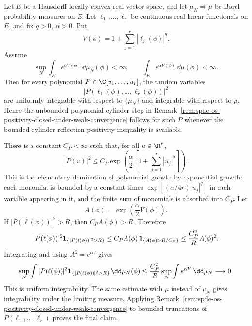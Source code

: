 \begin{remark}
\label{rem:spde-polynomial-os-uniform-integrability}
Let \(E\) be a Hausdorff locally convex real vector space, and let
\(\mu_N\Rightarrow\mu\) be Borel probability measures on \(E\).  Let
\(\ell_1,\ldots,\ell_r\) be continuous real linear functionals on \(E\), and
fix \(q>0\), \(\alpha>0\).  Put
\[
  V(\phi)=1+\sum_{j=1}^r|\ell_j(\phi)|^q .
\]
Assume
\begin{equation}
  \sup_N\int_E e^{\alpha V(\phi)}\,\dd\mu_N(\phi)<\infty,
  \qquad
  \int_E e^{\alpha V(\phi)}\,\dd\mu(\phi)<\infty .
  \label{eq:spde-exponential-cylinder-moment-bound}
\end{equation}
Then for every polynomial \(P\in\C[u_1,\ldots,u_r]\), the random variables
\[
  |P(\ell_1(\phi),\ldots,\ell_r(\phi))|^2
\]
are uniformly integrable with respect to \(\{\mu_N\}\) and integrable with
respect to \(\mu\).  Hence the unbounded polynomial-cylinder step in
Remark~\ref{rem:spde-os-positivity-closed-under-weak-convergence}
follows for such \(P\) whenever the bounded-cylinder reflection-positivity
inequality is available.

There is a constant \(C_P<\infty\) such that, for all \(u\in\R^r\),
\begin{equation}
  |P(u)|^2\leq C_P
  \exp\!\left(\frac{\alpha}{2}
    \left[1+\sum_{j=1}^r|u_j|^q\right]\right).
  \label{eq:spde-polynomial-by-exponential-bound}
\end{equation}
This is the elementary domination of polynomial growth by exponential
growth: each monomial is bounded by a constant times
\(\exp[(\alpha/4r)|u_j|^q]\) in each variable appearing in it, and the
finite sum of monomials is absorbed into \(C_P\).  Let
\[
  A(\phi)=
  \exp\!\left(\frac{\alpha}{2}V(\phi)\right).
\]
If \(|P(\ell(\phi))|^2>R\), then
\(C_PA(\phi)>R\).  Therefore
\[
  |P(\ell(\phi))|^2
  {\bf 1}_{\{|P(\ell(\phi))|^2>R\}}
  \leq
  C_P A(\phi)\,{\bf 1}_{\{A(\phi)>R/C_P\}}
  \leq
  \frac{C_P^2}{R}A(\phi)^2 .
\]
Integrating and using
\(A^2=e^{\alpha V}\) gives
\[
  \sup_N
  \int |P(\ell(\phi))|^2
  {\bf 1}_{\{|P(\ell(\phi))|^2>R\}}\,\dd\mu_N(\phi)
  \leq
  \frac{C_P^2}{R}
  \sup_N\int e^{\alpha V}\,\dd\mu_N
  \longrightarrow0 .
\]
This is uniform integrability.  The same estimate with \(\mu\) instead of
\(\mu_N\) gives integrability under the limiting measure.  Applying
Remark~\ref{rem:spde-os-positivity-closed-under-weak-convergence} to
bounded truncations of \(P(\ell_1,\ldots,\ell_r)\) proves the final claim.
\end{remark}

